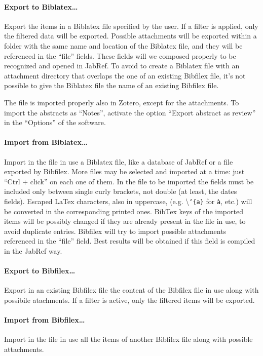 \documentclass[a4paper,12pt]{report}
\begin{document}
\paragraph{Export to Biblatex\dots} Export the items in a Biblatex file specified by the user. If a filter is applied, only the filtered data will be exported. Possible attachments will be exported within a folder with the same name and location of the Biblatex file, and they will be referenced in the “file” fields. These fields will we composed properly to be recognized and opened in JabRef. To avoid to create a Biblatex file with an attachment directory that overlaps the one of an existing Bibfilex file, it's not possible to give the Biblatex file the name of an existing Bibfilex file.

\noindent The file is imported properly also in Zotero, except for the attachments. To import the abstracts as “Notes”, activate the option “Export abstract as review” in the “Options” of the software. 

\paragraph{Import from Biblatex\dots} Import in the file in use a Biblatex file, like a database of JabRef or a file exported by Bibfilex. More files may be selected and imported at a time: just “Ctrl + click” on each one of them. In the file to be imported the fields must be included only between single curly brackets, not double (at least, the dates fields). Escaped LaTex characters, also in uppercase, (e.g. \textbackslash \texttt{`\{a\}} for \texttt{à}, etc.) will be converted in the corresponding printed ones. BibTex keys of the imported items will be possibly changed if they are already present in the file in use, to avoid duplicate entries. Bibfilex will try to import possible attachments referenced in the “file” field. Best results will be obtained if this field is compiled in the JabRef way.

\paragraph{Export to Bibfilex\dots} Export in an existing Bibfilex file the content of the Bibfilex file in use along with possibile atachments. If a filter is active, only the filtered items will be exported.

\paragraph{Import from Bibfilex\dots} Import in the file in use all the items of another Bibfilex file along with possible attachments.
\end{document}
